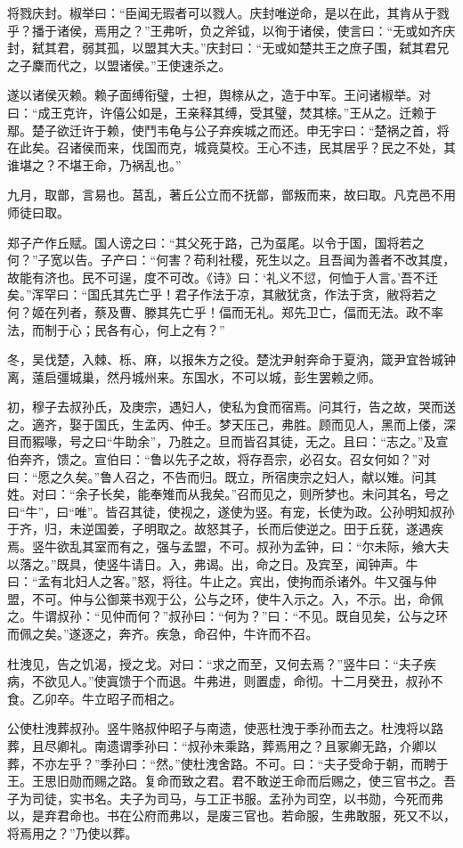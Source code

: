 \documentclass[a4paper,12pt,UTF8,twoside]{ctexbook}
\begin{document}
将戮庆封。椒举曰：“臣闻无瑕者可以戮人。庆封唯逆命，是以在此，其肯从于戮乎？播于诸侯，焉用之？”王弗听，负之斧钺，以徇于诸侯，使言曰：“无或如齐庆封，弑其君，弱其孤，以盟其大夫。”庆封曰：“无或如楚共王之庶子围，弑其君兄之子麇而代之，以盟诸侯。”王使速杀之。

遂以诸侯灭赖。赖子面缚衔璧，士袒，舆榇从之，造于中军。王问诸椒举。对曰：“成王克许，许僖公如是，王亲释其缚，受其璧，焚其榇。”王从之。迁赖于鄢。楚子欲迁许于赖，使鬥韦龟与公子弃疾城之而还。申无宇曰：“楚祸之首，将在此矣。召诸侯而来，伐国而克，城竟莫校。王心不违，民其居乎？民之不处，其谁堪之？不堪王命，乃祸乱也。”

九月，取鄫，言易也。莒乱，著丘公立而不抚鄫，鄫叛而来，故曰取。凡克邑不用师徒曰取。

郑子产作丘赋。国人谤之曰：“其父死于路，己为虿尾。以令于国，国将若之何？”子宽以告。子产曰：“何害？苟利社稷，死生以之。且吾闻为善者不改其度，故能有济也。民不可逞，度不可改。《诗》曰：‘礼义不愆，何恤于人言。’吾不迁矣。”浑罕曰：“国氏其先亡乎！君子作法于凉，其敝犹贪，作法于贪，敝将若之何？姬在列者，蔡及曹、滕其先亡乎！偪而无礼。郑先卫亡，偪而无法。政不率法，而制于心；民各有心，何上之有？”

冬，吴伐楚，入棘、栎、麻，以报朱方之役。楚沈尹射奔命于夏汭，箴尹宜咎城钟离，薳启彊城巢，然丹城州来。东国水，不可以城，彭生罢赖之师。

初，穆子去叔孙氏，及庚宗，遇妇人，使私为食而宿焉。问其行，告之故，哭而送之。適齐，娶于国氏，生孟丙、仲壬。梦天压己，弗胜。顾而见人，黑而上偻，深目而豭喙，号之曰“牛助余”，乃胜之。旦而皆召其徒，无之。且曰：“志之。”及宣伯奔齐，馈之。宣伯曰：“鲁以先子之故，将存吾宗，必召女。召女何如？”对曰：“愿之久矣。”鲁人召之，不告而归。既立，所宿庚宗之妇人，献以雉。问其姓。对曰：“余子长矣，能奉雉而从我矣。”召而见之，则所梦也。未问其名，号之曰“牛”，曰“唯”。皆召其徒，使视之，遂使为竖。有宠，长使为政。公孙明知叔孙于齐，归，未逆国姜，子明取之。故怒其子，长而后使逆之。田于丘莸，遂遇疾焉。竖牛欲乱其室而有之，强与孟盟，不可。叔孙为孟钟，曰：“尔未际，飨大夫以落之。”既具，使竖牛请日。入，弗谒。出，命之日。及宾至，闻钟声。牛曰：“孟有北妇人之客。”怒，将往。牛止之。宾出，使拘而杀诸外。牛又强与仲盟，不可。仲与公御莱书观于公，公与之环，使牛入示之。入，不示。出，命佩之。牛谓叔孙：“见仲而何？”叔孙曰：“何为？”曰：“不见。既自见矣，公与之环而佩之矣。”遂逐之，奔齐。疾急，命召仲，牛许而不召。

杜洩见，告之饥渴，授之戈。对曰：“求之而至，又何去焉？”竖牛曰：“夫子疾病，不欲见人。”使寘馈于个而退。牛弗进，则置虚，命彻。十二月癸丑，叔孙不食。乙卯卒。牛立昭子而相之。

公使杜洩葬叔孙。竖牛赂叔仲昭子与南遗，使恶杜洩于季孙而去之。杜洩将以路葬，且尽卿礼。南遗谓季孙曰：“叔孙未乘路，葬焉用之？且冢卿无路，介卿以葬，不亦左乎？”季孙曰：“然。”使杜洩舍路。不可。曰：“夫子受命于朝，而聘于王。王思旧勋而赐之路。复命而致之君。君不敢逆王命而后赐之，使三官书之。吾子为司徒，实书名。夫子为司马，与工正书服。孟孙为司空，以书勋，今死而弗以，是弃君命也。书在公府而弗以，是废三官也。若命服，生弗敢服，死又不以，将焉用之？”乃使以葬。
\end{document}
